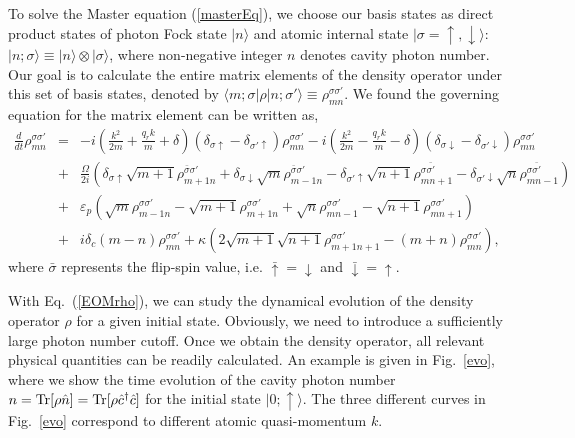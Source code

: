 \documentclass[atoms,article,submit,moreauthors,dvi2pdf,12pt,a4paper]{mdpi}
\def\ba{\begin{eqnarray}}
\def\ea{\end{eqnarray}}
\begin{document}
To solve the Master equation (\ref{masterEq}), we choose our basis states as direct product states of photon Fock state $|n \rangle$ and atomic internal state $|\sigma=\uparrow,\downarrow \rangle$: $|n;\sigma\rangle \equiv |n \rangle \otimes |\sigma \rangle$, %
where non-negative integer $n$ denotes cavity photon number. Our goal is to calculate the entire matrix elements of the density operator under this set of basis states, denoted by $\langle m;\sigma|\rho|n;\sigma'\rangle\equiv\rho_{mn}^{\sigma\sigma'}$. We found the governing equation for the matrix element can be written as,
\ba
\frac{d}{dt}\rho_{mn}^{\sigma\sigma'}
& = & -i\left(\frac{{k}^{2}}{2m}+\frac{q_{r}k}{m}+ \delta\right)\left(\delta_{\sigma\uparrow}-\delta_{\sigma'\uparrow}\right)\rho_{mn}^{\sigma\sigma'}
-  i\left(\frac{{k}^{2}}{2m}-\frac{q_{r}k}{m}-\delta\right)\left(\delta_{\sigma\downarrow}-\delta_{\sigma'\downarrow}\right)\rho_{mn}^{\sigma\sigma'}\nonumber\\
& + & \frac{\Omega}{2i}(\delta_{\sigma\uparrow}\sqrt{m+1}\rho_{m+1n}^{\bar{\sigma}\sigma'}
+\delta_{\sigma\downarrow}\sqrt{m}\rho_{m-1n}^{\bar{\sigma}\sigma'}
-\delta_{\sigma'\uparrow}\sqrt{n+1}\rho_{mn+1}^{\sigma\bar{\sigma'}}
-\delta_{\sigma'\downarrow}\sqrt{n}\rho_{mn-1}^{\sigma\bar{\sigma'}})\nonumber\\
& + & \varepsilon_{p}\left(\sqrt{m}\rho_{m-1n}^{\sigma\sigma'}-\sqrt{m+1}\rho_{m+1n}^{\sigma\sigma'}+\sqrt{n}\rho_{mn-1}^{\sigma\sigma'}-\sqrt{n+1}\rho_{mn+1}^{\sigma\sigma'}\right)\nonumber\\
& + & i\delta_{c}\left(m-n\right)\rho_{mn}^{\sigma\sigma'}
+ \kappa\left(2\sqrt{m+1}\sqrt{n+1}\rho_{m+1n+1}^{\sigma\sigma'}-(m+n)\rho_{mn}^{\sigma\sigma'}\right),\label{EOMrho}
\ea
where $\bar{\sigma}$ represents the flip-spin value, i.e. $\bar{\uparrow}=\downarrow$ and $\bar{\downarrow}=\uparrow$.

With Eq.~(\ref{EOMrho}), we can study the dynamical evolution of the density operator $\rho$ for a given initial state. Obviously, we need to introduce a sufficiently large photon number cutoff. Once we obtain the density operator, all relevant physical quantities can be readily calculated. An example is given in Fig.~\ref{evo}, where we show the time evolution of the cavity photon number $n = {\rm Tr}[\rho \hat{n}]= {\rm Tr}[\rho \hat{c}^\dag \hat{c}]$ for the initial state $|0; \uparrow \rangle$. The three different curves in Fig.~\ref{evo} correspond to different atomic quasi-momentum $k$.
\end{document}
